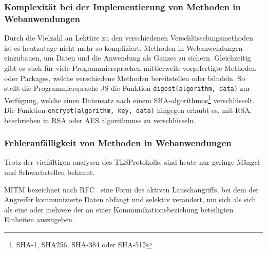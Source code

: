 \subsubsection[Komplexität bei der Implementierung von kryptografischen Methoden]{Komplexität bei der Implementierung von  Methoden in Webanwendungen}\label{subsubsec:komplexitaet_bei_der_implementierung_von_Kryptografischen_methoden_in_webanwendungen}
Durch die Vielzahl an Lektüre zu den verschiedenen Verschlüsselungsmethoden\autocites[\zb][]{davies2011implementing} ist es heutzutage nicht mehr so kompliziert,  Methoden in Webanwendungen einzubauen, um Daten und die Anwendung als Ganzes zu sichern.
Gleichzeitig gibt es auch für viele Programmiersprachen mittlerweile vorgefertigte Methoden oder Packages, welche verschiedene  Methoden bereitstellen oder bündeln.
So stellt die Programmiersprache \ac{JS} die Funktion \lstinline!digest(algorithm, data)! zur Verfügung, welche einen Datensatz nach einem \ac{SHA}-\gls{algorithmus}\footnote{\ac{SHA}-1, \gls{SHA256}, \ac{SHA}-384 oder \ac{SHA}-512} verschlüsselt.\autocite[\vglf][]{SubtleCr83:online}
Die Funktion \lstinline!encrypt(algorithm, key, data)! hingegen erlaubt es, mit RSA, beschrieben in \ac{RSA} oder \ac{AES} \glspl{algorithmus} zu verschlüsseln.

\subsubsection[Fehleranfälligkeit von kryptografischen Methoden in Webanwendungen]{Fehleranfälligkeit von  Methoden in Webanwendungen}\label{subsubsec:fehleranfälligkeit_von_Kryptografischen_methoden_in_webanwendungen}
Trotz der vielfältigen analysen des \ac{TLS}\nonbreakdash Protokolls\autocites[Siehe \zb][]{krawczyk2013security, paulson1999inductive, dowling2015cryptographic, cremers2017comprehensive}, sind heute nur geringe Mängel und Schwachstellen bekannt.\autocite[\vglf][]{OPPLIGER20062238}

\begin{definition}
    \ac{MITM} bezeichnet nach \ac{RFC}\ \autocite[Übersetzt aus][]{rfc2828} eine Form des aktiven Lauschangriffs, bei dem der Angreifer kommunizierte Daten abfängt und selektiv verändert, um sich als sich als eine oder mehrere der an einer Kommunikationsbeziehung beteiligten Einheiten auszugeben.
\end{definition}

